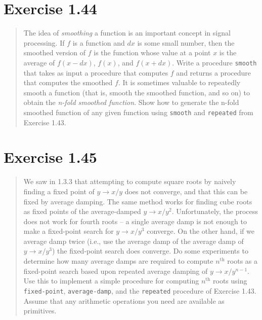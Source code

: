 \documentclass{article}
\begin{document}


\section{Exercise 1.44}
\begin{quote}
    The idea of \emph{smoothing} a function is an important concept in signal
    processing. If $f$ is a function and $dx$ is some small number, then the
    smoothed version of $f$ is the function whose value at a point $x$ is the
    average of $f(x-dx)$, $f(x)$, and $f(x+dx)$. Write a procedure
    \texttt{smooth} that takes as input a procedure that computes $f$ and
    returns a procedure that computes the smoothed $f$. It is sometimes valuable
    to repeatedly smooth a function (that is, smooth the smoothed function, and
    so on) to obtain the \emph{n-fold smoothed function}. Show how to generate
    the n-fold smoothed function of any given function using \texttt{smooth} and
    \texttt{repeated} from Exercise 1.43.
\end{quote}



\section{Exercise 1.45}
\begin{quote}
    We saw in 1.3.3 that attempting to compute square roots by naively finding
    a fixed point of $y\rightarrow x/y$ does not converge, and that this can be
    fixed by average damping. The same method works for finding cube roots as
    fixed points of the average-damped $y\rightarrow x/y^2$. Unfortunately, the
    process does not work for fourth roots -- a single average damp is not
    enough to make a fixed-point search for $y\rightarrow x/y^3$ converge. On
    the other hand, if we average damp twice (i.e., use the average damp of the
    average damp of $y\rightarrow x/y^3$) the fixed-point search does converge.
    Do some experiments to determine how many average damps are required to
    compute $n^{\textrm{th}}$ roots as a fixed-point search based upon repeated
    average damping of $y\rightarrow x/y^{n-1}$.  Use this to implement a
    simple procedure for computing $n^{\textrm{th}}$ roots using
    \texttt{fixed-point}, \texttt{average-damp}, and the \texttt{repeated}
    procedure of Exercise 1.43.  Assume that any arithmetic operations you need
    are available as primitives.
\end{quote}
\end{document}
